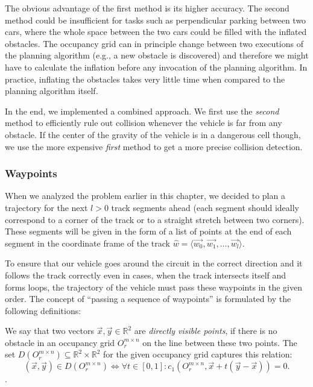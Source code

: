 The obvious advantage of the first method is its higher accuracy. The second method could be insufficient for tasks such as perpendicular parking between two cars, where the whole space between the two cars could be filled with the inflated obstacles. The occupancy grid can in principle change between two executions of the planning algorithm (e.g., a new obstacle is discovered) and therefore we might have to calculate the inflation before any invocation of the planning algorithm. In practice, inflating the obstacles takes very little time when compared to the planning algorithm itself.

In the end, we implemented a combined approach. We first use the \textit{second} method to efficiently rule out collision whenever the vehicle is far from any obstacle. If the center of the gravity of the vehicle is in a dangerous cell though, we use the more expensive \textit{first} method to get a more precise collision detection.

\subsubsection{Waypoints}

When we analyzed the problem earlier in this chapter, we decided to plan a trajectory for the next $l>0$ track segments ahead (each segment should ideally correspond to a corner of the track or to a straight stretch between two corners). These segments will be given in the form of a list of points at the end of each segment in the coordinate frame of the track $\hat{w}=\langle \vec{w_0}, \vec{w_1}, \ldots, \vec{w_l} \rangle$.

To ensure that our vehicle goes around the circuit in the correct direction and it follows the track correctly even in cases, when the track intersects itself and forms loops, the trajectory of the vehicle must pass these waypoints in the given order. The concept of ``passing a sequence of waypoints'' is formulated by the following definitions:

\begin{defn}
	We say that two vectors $\vec{x},\vec{y}\in\mathbb{R}^2$ are \textit{directly visible points}, if there is no obstacle in an occupancy grid $O_r^{m\times n}$ on the line between these two points. The set $D(O_r^{m\times n})\subseteq \mathbb{R}^2\times\mathbb{R}^2$ for the given occupancy grid captures this relation:
	\[
	(\vec{x}, \vec{y}) \in D(O_r^{m\times n}) \iff \forall t \in \left[0, 1\right]: c_1(O_{r}^{m\times n}, \vec{x} + t(\vec{y}-\vec{x})) = 0.
	\]
	\label{def:directly_visible_points}.
\end{defn}

